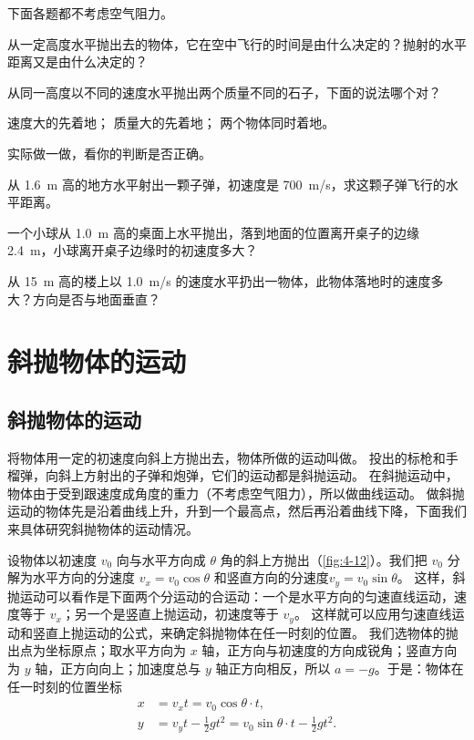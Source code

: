 \begin{Practice}
下面各题都不考虑空气阻力。
\begin{question}
  \item 从一定高度水平抛出去的物体，它在空中飞行的时间是由什么决定的？抛射的水平距离又是由什么决定的？
  \item 从同一高度以不同的速度水平抛出两个质量不同的石子，下面的说法哪个对？
  \begin{tasks}
    \task 速度大的先着地；
    \task 质量大的先着地；
    \task 两个物体同时着地。
  \end{tasks}
  实际做一做，看你的判断是否正确。
  \item 从 \qty{1.6}{m} 高的地方水平射出一颗子弹，初速度是 \qty{700}{m/s}，求这颗子弹飞行的水平距离。
  \item 一个小球从 \qty{1.0}{m} 高的桌面上水平抛出，落到地面的位置离开桌子的边缘 \qty{2.4}{m}，小球离开桌子边缘时的初速度多大？
  \item 从 \qty{15}{m} 高的楼上以 \qty{1.0}{m/s} 的速度水平扔出一物体，此物体落地时的速度多大？方向是否与地面垂直？
\end{question}
\end{Practice}

\section{斜抛物体的运动}
\subsection{斜抛物体的运动} 
将物体用一定的初速度向斜上方抛出去，物体所做的运动叫做。
投出的标枪和手榴弹，向斜上方射出的子弹和炮弹，它们的运动都是斜抛运动。
在斜抛运动中，物体由于受到跟速度成角度的重力（不考虑空气阻力），所以做曲线运动。
做斜抛运动的物体先是沿着曲线上升，升到一个最高点，然后再沿着曲线下降，下面我们来具体研究斜抛物体的运动情况。

设物体以初速度 $v_0$ 向与水平方向成 $\theta$ 角的斜上方抛出（\cref{fig:4-12}）。我们把 $v_0$ 分解为水平方向的分速度 $v_x=v_0\cos\theta$ 和竖直方向的分速度$v_y=v_0\sin\theta$。
这样，斜抛运动可以看作是下面两个分运动的合运动：一个是水平方向的匀速直线运动，速度等于 $v_x$；另一个是竖直上抛运动，初速度等于 $v_y$。
这样就可以应用匀速直线运动和竖直上抛运动的公式，来确定斜抛物体在任一时刻的位置。
我们选物体的抛出点为坐标原点；取水平方向为 $x$ 轴，正方向与初速度的方向成锐角；竖直方向为 $y$ 轴，正方向向上；加速度总与 $y$ 轴正方向相反，所以 $a=-g$。于是：物体在任一时刻的位置坐标
\[\begin{split}
x&=v_x t=v_0\cos\theta \cdot t,\\
y&=v_y t-\frac{1}{2}gt^2=v_0\sin\theta \cdot t-\frac{1}{2}gt^2.
\end{split} \]


